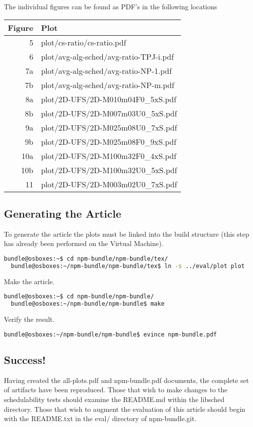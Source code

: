 \documentclass[a4paper]{article}
\begin{document}
{\noindent}The individual figures can be found as PDF's in the following
locations 
\begin{table}[ht]
  \centering
  \begin{tabular}{r|l}
    Figure & Plot \\
    \hline
    5 & plot/cs-ratio/cs-ratio.pdf \\
    6 & plot/avg-alg-sched/avg-ratio-TPJ-i.pdf \\
    7a & plot/avg-alg-sched/avg-ratio-NP-1.pdf \\
    7b & plot/avg-alg-sched/avg-ratio-NP-m.pdf \\
    8a & plot/2D-UFS/2D-M010m04F0\_5xS.pdf \\
    8b & plot/2D-UFS/2D-M007m03U0\_5xS.pdf \\
    9a & plot/2D-UFS/2D-M025m08U0\_7xS.pdf \\
    9b & plot/2D-UFS/2D-M025m08F0\_9xS.pdf \\
    10a & plot/2D-UFS/2D-M100m32F0\_4xS.pdf \\
    10b & plot/2D-UFS/2D-M100m32U0\_5xS.pdf \\
    11 & plot/2D-UFS/2D-M003m02U0\_7xS.pdf
  \end{tabular}
\end{table}

\subsection{Generating the Article}

To generate the article the plots must be linked into the build
structure (this step has already been performed on the Virtual
Machine).

\begin{lstlisting}[language=bash]
  bundle@osboxes:~$ cd npm-bundle/npm-bundle/tex/
  bundle@osboxes:~/npm-bundle/npm-bundle/tex$ ln -s ../eval/plot plot
\end{lstlisting}

{\noindent}Make the article.
\begin{lstlisting}[language=bash]
  bundle@osboxes:~$ cd npm-bundle/npm-bundle/
  bundle@osboxes:~/npm-bundle/npm-bundle$ make
\end{lstlisting}

{\noindent}Verify the result.
\begin{lstlisting}[language=bash]
  bundle@osboxes:~/npm-bundle/npm-bundle$ evince npm-bundle.pdf
\end{lstlisting}

\subsection{Success!}

Having created the all-plots.pdf and npm-bundle.pdf documents, the
complete set of artifacts have been reproduced. Those that wish to make
changes to the schedulability tests should examine the README.md
within the libsched directory. Those that wish to augment the
evaluation of this article should begin with the README.txt in the
eval/ directory of npm-bundle.git.
\end{document}
